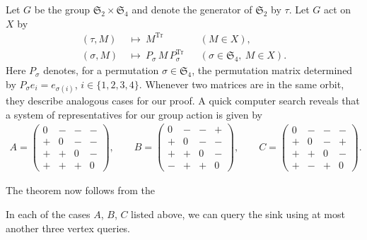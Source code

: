 \documentclass[runningheads,a4paper]{llncs}
\newcommand{\Sym}{\ensuremath{\mathfrak{S}}}
\newcommand{\Tr}{\ensuremath{\mathrm{Tr}}}
\begin{document}
Let $G$ be the group $\Sym_2 \times \Sym_4$ and denote the generator of
$\Sym_2$ by $\tau$.
Let $G$ act on $X$ by
\begin{align*}
    (\tau,M) ~&\mapsto~ M^\Tr   && (M \in X),
    \\
    (\sigma,M) ~&\mapsto~ P_\sigma \, M \, P_\sigma^\Tr
            && (\sigma \in \Sym_4,~ M \in X).
\end{align*}
Here $P_\sigma$ denotes, for a permutation $\sigma \in \Sym_4$, the
permutation matrix determined by $P_\sigma e_i = e_{\sigma(i)}$, $i \in
\{1,2,3,4\}$.
Whenever two matrices are in the same orbit, they describe analogous cases for
our proof.
A quick computer search reveals that a system of representatives for our group
action is given by
\begin{align*}
    A =
        \begin{pmatrix}
            0 & - & - & -
            \\
            + & 0 & - & -
            \\
            + & + & 0 & -
            \\
            + & + & + & 0
        \end{pmatrix},
    \qquad
    B =
        \begin{pmatrix}
            0 & - & - & +
            \\
            + & 0 & - & -
            \\
            + & + & 0 & -
            \\
            - & + & + & 0
        \end{pmatrix},
    \qquad
    C =
        \begin{pmatrix}
            0 & - & - & -
            \\
            + & 0 & - & +
            \\
            + & + & 0 & -
            \\
            + & - & + & 0
        \end{pmatrix}.
\end{align*}

The theorem now follows from the
\begin{lemma}
    In each of the cases $A$, $B$, $C$ listed above, we can query the sink
    using at most another three vertex queries.
\end{lemma}
\end{document}
